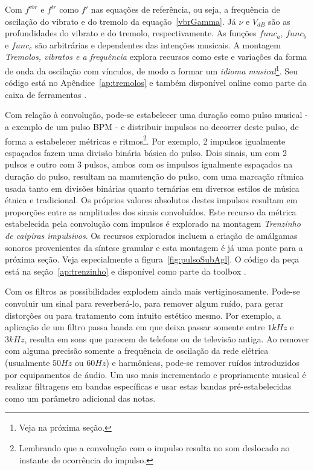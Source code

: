 Com $f^{vbr}$ e $f^{tr}$ como $f'$ nas equações de referência, ou seja, a frequência
de oscilação do vibrato e do tremolo da equação~\ref{vbrGamma}. Já $\nu$ e $V_{dB}$ são as profundidades
do vibrato e do tremolo, respectivamente. As funções $func_a$,
$func_b$ e $func_c$ são arbitrárias e dependentes das intenções musicais. A montagem 
\emph{Tremolos, vibratos e a frequência} explora
recursos como este e variações da forma de onda da oscilação com vínculos, de modo a formar um \emph{idioma musical}\footnote{Veja na próxima seção.}. Seu código está no Apêndice~\ref{ap:tremolos} e também disponível online como parte da caixa de ferramentas \massa.


Com relação à convolução, pode-se estabelecer uma duração como pulso musical - a exemplo de um pulso BPM - 
e distribuir impulsos no decorrer deste pulso, de forma a estabelecer métricas e ritmos\footnote{Lembrando
que a convolução com o impulso resulta no som deslocado ao instante de ocorrência do impulso.}.
Por exemplo, 2 impulsos igualmente espaçados fazem uma
divisão binária básica do pulso. Dois sinais, um com 2 pulsos e outro com 3 pulsos,
ambos com os impulsos igualmente espaçados na duração do pulso, resultam na manutenção
do pulso, com uma marcação rítmica usada tanto em divisões binárias quanto ternárias em diversos
estilos de música étnica e tradicional.\cite{Gramani} 
Os próprios valores absolutos destes impulsos resultam em proporções entre as amplitudes dos sinais
convoluídos.
Este recurso da métrica
estabelecida pela convolução com impulsos é explorado na montagem \emph{Trenzinho de caipiras impulsivos}. Os recursos explorados incluem a criação de amálgamas sonoros provenientes da síntese granular e esta montagem é já uma ponte para a próxima seção. Veja especialmente a figura~\ref{fig:pulsoSubAgl}. O código da peça está na seção~\ref{ap:trenzinho} e disponível como parte da toolbox \massa.

Com os filtros as possibilidades explodem ainda mais vertiginosamente. Pode-se convoluir um sinal para reverberá-lo, para
remover algum ruído, para gerar distorções ou para tratamento com intuito estético mesmo. Por exemplo,
a aplicação de um filtro passa banda em que deixa passar somente entre $1kHz$ e $3kHz$, resulta em sons
que parecem de telefone ou de televisão antiga. Ao remover com alguma precisão somente
a frequência de oscilação da rede elétrica (usualmente $50Hz$ ou $60Hz$) e harmônicas, pode-se remover
ruídos introduzidos por equipamentos de áudio.
Um uso mais incrementado
e propriamente musical é realizar filtragens em bandas específicas e usar estas bandas
pré-estabelecidas como um parâmetro adicional das notas.

